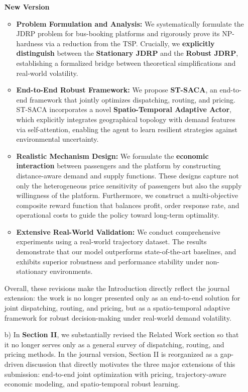 \documentclass[11pt, a4paper]{article}
\begin{document}
\begin{itemize}
    \begin{boxedminipage}[htbp]{\linewidth}
    \vspace{2mm}
    \noindent \textbf{New Version}
    \begin{itemize}
        \item \textbf{Problem Formulation and Analysis:} We systematically formulate the JDRP problem for bus-booking platforms and rigorously prove its NP-hardness via a reduction from the TSP. Crucially, we \textbf{explicitly distinguish} between the \textbf{Stationary JDRP} and the \textbf{Robust JDRP}, establishing a formalized bridge between theoretical simplifications and real-world volatility.
        \item \textbf{End-to-End Robust Framework:} We propose \textbf{ST-SACA}, an end-to-end framework that jointly optimizes dispatching, routing, and pricing. ST-SACA incorporates a novel \textbf{Spatio-Temporal Adaptive Actor}, which explicitly integrates geographical topology with demand features via self-attention, enabling the agent to learn resilient strategies against environmental uncertainty.
        \item \textbf{Realistic Mechanism Design:} We formulate the \textbf{economic interaction} between passengers and the platform by constructing distance-aware demand and supply functions. These designs capture not only the heterogeneous price sensitivity of passengers but also the supply willingness of the platform. Furthermore, we construct a multi-objective composite reward function that balances profit, order response rate, and operational costs to guide the policy toward long-term optimality.
        \item \textbf{Extensive Real-World Validation:} We conduct comprehensive experiments using a real-world trajectory dataset. The results demonstrate that our model outperforms state-of-the-art baselines, and exhibits superior robustness and performance stability under non-stationary environments.
    \end{itemize}
    \vspace{2mm}
    \end{boxedminipage}

    Overall, these revisions make the Introduction directly reflect the journal extension: the work is no longer presented only as an end-to-end solution for joint dispatching, routing, and pricing, but as a spatio-temporal adaptive framework for robust decision-making under real-world demand volatility.
    
    
    \item[b)] In \textbf{Section II}, we substantially revised the Related Work section so that it no longer serves only as a general survey of dispatching, routing, and pricing methods. In the journal version, Section II is reorganized as a gap-driven discussion that directly motivates the three major extensions of this submission: end-to-end joint optimization with pricing, trajectory-aware economic modeling, and spatio-temporal robust learning.


\end{itemize}
\end{document}
